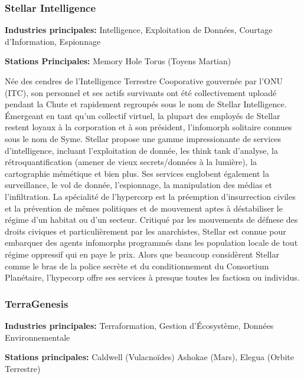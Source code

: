 \subsubsection{Stellar Intelligence} \label{sec:stellar-intelligence} 

\textbf{Industries principales:} Intelligence, Exploitation de Données, Courtage d'Information, Espionnage 

\textbf{Stations Principales:} Memory Hole Torus (Toyens Martian) 

Née des cendres de l'Intelligence Terrestre Cooporative gouvernée par l'ONU (ITC), son personnel et ses actifs survivants ont été collectivement uploadé pendant la Chute et rapidement regroupés sous le nom de Stellar Intelligence. Émergeant en tant qu'un collectif virtuel, la plupart des employés de Stellar restent loyaux à la corporation et à son président, l'infomorph solitaire connues sous le nom de Syme. Stellar propose une gamme impressionante de services d'intelligence, incluant l'exploitation de donnée, les think tank d'analyse, la rétroquantification (amener de vieux secrets/données à la lumière), la cartographie mémétique et bien plus. Ses services englobent également la surveillance, le vol de donnée, l'espionnage, la manipulation des médias et l'infiltration. La spécialité de l'hypercorp est la préemption d'insurrection civiles et la prévention de mêmes politiques et de mouvement aptes à déstabiliser le régime d'un habitat ou d'un secteur. Critiqué par les mouvements de défnese des droits civiques et particulièrement par les anarchistes, Stellar est connue pour embarquer des agents infomorphs programmés dans les population locale de tout régime oppressif qui en paye le prix. Alors que beaucoup considèrent Stellar comme le bras de la police secrète et du conditionnement du Consortium Planétaire, l'hypecorp offre ses services à presque toutes les factiosn ou individus. 

\subsubsection{TerraGenesis} \label{sec:terragenesis} 

\textbf{Industries principales:} Terraformation, Gestion d'Écosystème, Données Environnementale 

\textbf{Stations principales:} Caldwell (Vulacnoïdes) Ashokae (Mars), Elegua (Orbite Terrestre) 

